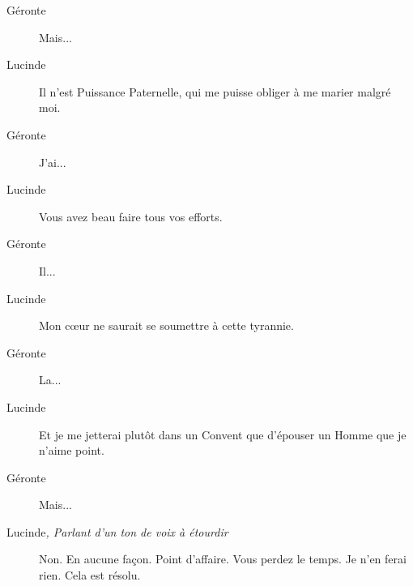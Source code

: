 \documentclass[french,twoside]{book} %
\begin{document}
 \begin{description} \item[Géronte] 

Mais...\end{description}
 \begin{description} \item[Lucinde] 

Il n’est Puissance Paternelle, qui me puisse obliger à me marier malgré moi.\end{description}
 \begin{description} \item[Géronte] 

J’ai...\end{description}
 \begin{description} \item[Lucinde] 

Vous avez beau faire tous vos efforts.\end{description}
 \begin{description} \item[Géronte] 

Il...\end{description}
 \begin{description} \item[Lucinde] 

Mon cœur ne saurait se soumettre à cette tyrannie.\end{description}
 \begin{description} \item[Géronte] 

La...\end{description}
 \begin{description} \item[Lucinde] 

Et je me jetterai plutôt dans un Convent que d’épouser un Homme que je n’aime point.\end{description}
 \begin{description} \item[Géronte] 

Mais...\end{description}
 \begin{description} \item[Lucinde\textit{, Parlant d’un ton de voix à étourdir}\par
] 

Non. En aucune façon. Point d’affaire. Vous perdez le temps. Je n’en ferai rien. Cela est résolu.\end{description}
\end{document}
